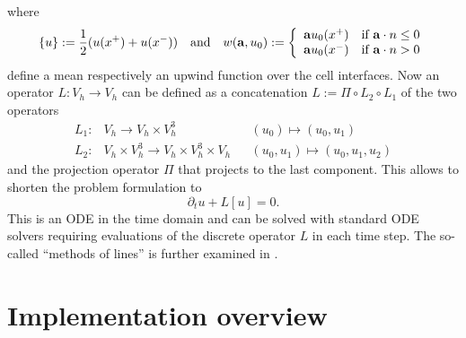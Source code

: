 %
where
%
\begin{equation}
  \{u\} := \frac{1}{2}(u(x^{+}) + u(x^{-})) \quad\mbox{and}\quad
  w(\velo, u_{0}) := \left\{
  \begin{array}[]{cl}
    \velo u_{0}(x^{+}) & \mbox{if}\ \velo \cdot n \leq 0 \\
    \velo u_{0}(x^{-}) & \mbox{if}\ \velo \cdot n > 0
  \end{array}
  \right.
  \label{eq:meanupwind}
\end{equation}
%
define a mean respectively an upwind function over the cell interfaces.
%
Now an operator $L : V_{h} \to V_{h}$ can be defined as a concatenation
$L:=\Pi \circ L_{2}\circ L_{1}$ of the two operators 
%
\begin{equation}
  \label{eq:passes}
  \begin{aligned}
    L_{1}:& V_{h} \to V_{h} \times V_{h}^{3} && (u_{0}) \mapsto (u_{0}, u_{1}) \\
    L_{2}:& V_{h} \times V_{h}^{3} \to V_{h} \times V_{h}^{3} \times V_{h} && (u_{0}, u_{1}) \mapsto (u_{0}, u_{1}, u_{2})
  \end{aligned}
\end{equation}
%
and the projection operator $\Pi$ that projects to the last component. This allows to
shorten the problem formulation to
%
\begin{equation}
  \partial_{t} u + L[u] = 0.
  \label{eq:advectdiffshort}
\end{equation}
%
This is an ODE in the time domain and can be solved with standard ODE solvers
requiring evaluations of the discrete operator $L$ in each time step. The
so-called ``methods of lines'' is further examined in
\cite[ch.4.3]{wissrechnen}.  
%
\section{Implementation overview}\label{se:overview}

